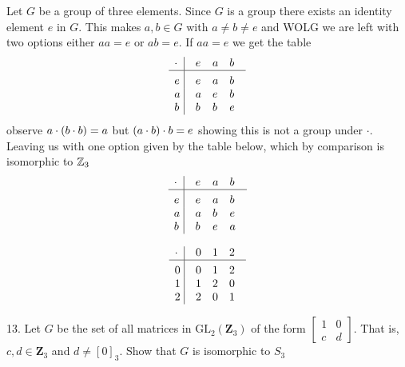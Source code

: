 \begin{mdframed}[style=darkAnswer,frametitle={Joe Starr}]
Let $G$ be a group of three elements. Since $G$ is a group there exists an 
identity element $e$ in $G$. This makes $a,b\in G$ with $a\neq b \neq e$ and WOLG
we are left with two options either $aa=e$ or $ab=e$. If $aa=e$ we get the table
$$\vbox{\tabskip0.5em\offinterlineskip
\halign{\strut$#$\hfil\ \tabskip1em\vrule&&$#$\hfil\cr
    \cdot      & e  & a   & b   \cr
    \noalign{\hrule}\vrule height 12pt width 0pt
    e  & e  & a   & b      \cr
    a  & a  & e   & b      \cr
    b  & b  & b   & e      \cr
  }}$$
observe $a\cdot\left(b\cdot b\right)=a$ but $\left(a\cdot b\right)\cdot b=e$ showing this is 
not a group under $\cdot$. 
Leaving us with one option given by the table below, which by comparison is 
isomorphic to $\mathbb{Z}_3$
$$\vbox{\tabskip0.5em\offinterlineskip
\halign{\strut$#$\hfil\ \tabskip1em\vrule&&$#$\hfil\cr
    \cdot      & e  & a   & b   \cr
    \noalign{\hrule}\vrule height 12pt width 0pt
    e  & e  & a   & b      \cr
    a  & a  & b   & e      \cr
    b  & b  & e   & a      \cr
  }}$$

$$\vbox{\tabskip0.5em\offinterlineskip
\halign{\strut$#$\hfil\ \tabskip1em\vrule&&$#$\hfil\cr
    \cdot      & 0  & 1   & 2   \cr
    \noalign{\hrule}\vrule height 12pt width 0pt
    0  & 0  & 1   & 2      \cr
    1  & 1  & 2   & 0      \cr
    2  & 2  & 0   & 1      \cr
  }}$$
\end{mdframed}
\newpage
\begin{mdframed}[style=darkQuesion]
13. Let $G$ be the set of all matrices in $\mathrm{GL}_{2}\left(\mathbf{Z}_{3}\right)$ of the form $\left[\begin{array}{ll}1 & 0 \\ c & d\end{array}\right] .$ That is, $c, d \in \mathbf{Z}_{3}$ and $d \neq[0]_{3} .$ Show that $G$ is isomorphic to $S_{3}$
\end{mdframed}
